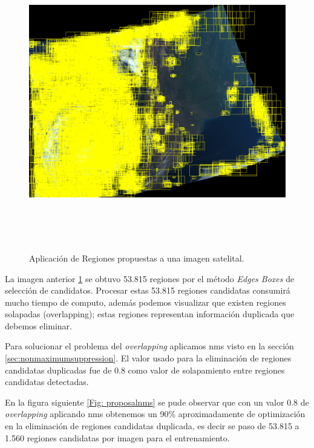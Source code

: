 \begin{enumerate}
\begin{figure}[H]
 \centering
  \includegraphics[height=13cm,keepaspectratio=true,clip=true]{imagenes/Logos/proposal.png}
  \caption{Aplicación de Regiones propuestas a una imagen satelital.}
	\label{Fig: proposal}
\end{figure}

\end{enumerate}
La imagen anterior \ref{Fig: proposal} se obtuvo 53.815 regiones por el método \textit{Edges Boxes} de selección de candidatos. Procesar estas 53.815 regiones candidatas consumirá mucho tiempo de computo, además podemos visualizar que existen regiones solapadas (overlapping); estas regiones representan información duplicada que debemos eliminar. 

Para solucionar el problema del \textit{overlapping}  aplicamos \ac{nms} visto en la sección \ref{sec:nonmaximumsuppression}. 
El valor usado para la eliminación de regiones candidatas duplicadas fue de 0.8 como valor de solapamiento entre regiones candidatas detectadas.

En la figura siguiente \ref{Fig: proposalnms} se pude observar que con un valor 0.8 de \textit{overlapping} aplicando \ac{nms} obtenemos un 90\% aproximadamente de optimización en la eliminación de regiones candidatas duplicada, es decir se paso de 53.815 a 1.560 regiones candidatas por imagen para el entrenamiento.

